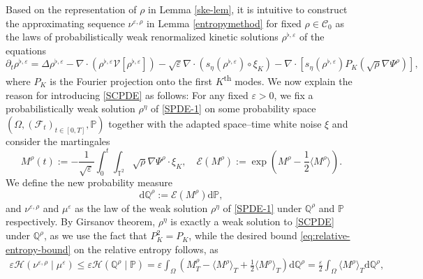  Based on the representation of $\rho$ in Lemma \ref{ske-lem}, it is intuitive to construct the approximating sequence $\nu^{\varepsilon, \rho}$ in Lemma \ref{entropymethod} for fixed $\rho \in \mathcal{C}_0$ as the laws of probabilistically weak renormalized kinetic solutions $\rho^{\flat,\varepsilon}$ of the equations
\begin{equation}\label{SCPDE}
  \partial_{t} \rho^{\flat,\varepsilon}=\Delta \rho^{\flat,\varepsilon} - \nabla\cdot \left(\rho^{\flat,\varepsilon}\mathcal{V}[\rho^{\flat,\varepsilon}]\right)
-\sqrt{\varepsilon}\nabla\cdot \left( s_{\eta}(\rho^{\flat,\varepsilon})\circ \xi_{K} \right)-\nabla\cdot \left[ s_{\eta}(\rho^{\flat,\varepsilon}) P_{K}\left(\sqrt{\rho}\nabla\Psi^{\rho}\right)\right],
\end{equation}
where $P_{K}$ is the Fourier projection onto the first $K$\textsuperscript{th} modes. We now explain the reason for introducing \eqref{SCPDE} as follows: For any fixed $\varepsilon > 0$, we fix a probabilistically weak solution $\rho^{\eta}$ of \eqref{SPDE-1} on some probability space $(\Omega, (\mathcal{F}_t)_{t \in [0,T]}, \mathbb{P})$ together with the adapted space--time white noise $\xi$ and consider the martingales
\begin{equation}\label{martingale}
M^{\rho}(t) := -\frac{1}{\sqrt{\varepsilon}}\int_0^t\int_{\mathbb{T}^2} \sqrt{\rho}\nabla\Psi^{\rho} \cdot \xi_{K}, \quad \mathcal{E}(M^{\rho}) := \exp\left(M^{\rho}-\frac{1}{2}\langle M^{\rho}\rangle\right).
\end{equation}
We define the new probability measure
\begin{equation}\label{Qmeasure}
\mathrm{d}\mathbb{Q}^{\rho} := \mathcal{E}(M^{\rho})\mathrm{d}\mathbb{P}, 
\end{equation}
and $\nu^{\varepsilon,\rho}$ and $\mu^{\varepsilon}$ as the law of the weak solution $\rho^{\eta}$ of \eqref{SPDE-1} under $\mathbb{Q}^{\rho}$ and $\mathbb{P}$ respectively.  By Girsanov theorem, $\rho^{\eta}$ is exactly a weak solution to \eqref{SCPDE} under $\mathbb{Q}^{\rho}$, as we use the fact that $P^2_K = P_K$, while the desired bound \eqref{eq:relative-entropy-bound} on the relative entropy follows, as
\begin{align*}
\varepsilon \mathcal{H}\left(\nu^{\varepsilon,\rho}\mid
\mu^{\varepsilon}\right) \leq \varepsilon \mathcal{H}\left(\mathbb{Q}^{\rho}
\mid\mathbb{P}\right) = \varepsilon \int_{\Omega} 
\left(M^{\rho}_T-\langle M^{\rho}\rangle_T+\frac{1}{2}\langle M^{\rho}\rangle_T\right)\mathrm{d}\mathbb{Q}^{\rho} = \frac{\varepsilon}{2} \int_{\Omega} 
\langle M^{\rho}\rangle_T\mathrm{d}\mathbb{Q}^{\rho},
\end{align*}
